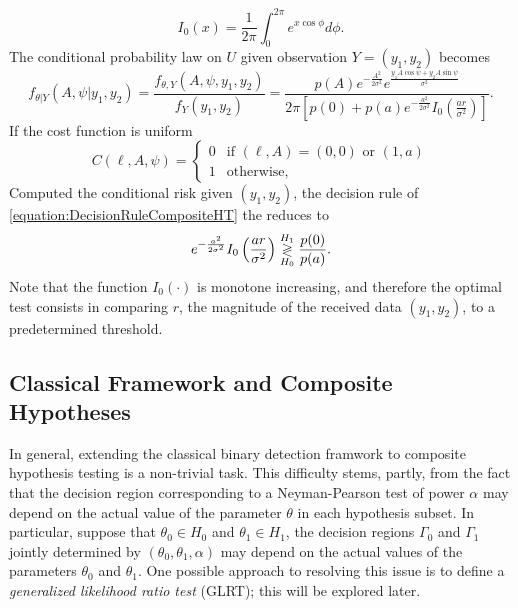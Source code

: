 \begin{example}
\begin{equation*}
I_0 (x) = \frac{1}{2 \pi} \int_0^{2 \pi} e^{x \cos \phi} d\phi .
\end{equation*}
The conditional probability law on $U$ given observation $Y = (y_1, y_2)$ becomes
\begin{equation*}
f_{\theta | Y} ( A,\psi | y_1, y_2 )
= \frac{f_{\theta, Y} ( A,\psi, y_1, y_2 )}{f_{Y} ( y_1, y_2 )}
= \frac{ p(A) e^{- \frac{A^2}{2 \sigma^2}}
e^{\frac{y_1 A \cos \psi + y_2 A \sin \psi}{ \sigma^2} } }
{ 2 \pi \left[ p(0) + p(a) e^{- \frac{a^2}{2 \sigma^2}}
I_0 \left( \frac{a r}{\sigma^2} \right) \right] } .
\end{equation*}
If the cost function is uniform
\begin{equation*}
C(\ell, A, \psi) = \begin{cases}
0 & \text{if } (\ell,A) = (0,0) \text{ or } (1,a) \\
1 & \text{otherwise}, \end{cases}
\end{equation*}
Computed the conditional risk given $(y_1, y_2)$, the decision rule of \eqref{equation:DecisionRuleCompositeHT} the reduces to
\begin{equation*}
e^{- \frac{a^2}{2 \sigma^2}} I_0 \left( \frac{a r}{\sigma^2} \right)
\overset{H_1}{ \underset{H_0}{\gtrless} } \frac{p(0)}{p(a)} .
\end{equation*}
Note that the function $I_0 (\cdot)$ is monotone increasing, and therefore the optimal test consists in comparing $r$, the magnitude of the received data $(y_1, y_2)$, to a predetermined threshold.
\end{example}
\newpage

\subsection{Classical Framework and Composite Hypotheses}

In general, extending the classical binary detection framwork to composite hypothesis testing is a non-trivial task.
This difficulty stems, partly, from the fact that the decision region corresponding to a Neyman-Pearson test of power $\alpha$ may depend on the actual value of the parameter $\theta$ in each hypothesis subset.
In particular, suppose that $\theta_0 \in H_0$ and $\theta_1 \in H_1$, the decision regions $\Gamma_0$ and $\Gamma_1$ jointly determined by $(\theta_0, \theta_1, \alpha)$ may depend on the actual values of the parameters $\theta_0$ and $\theta_1$.
One possible approach to resolving this issue is to define a \emph{generalized likelihood ratio test} (GLRT); this will be explored later.


